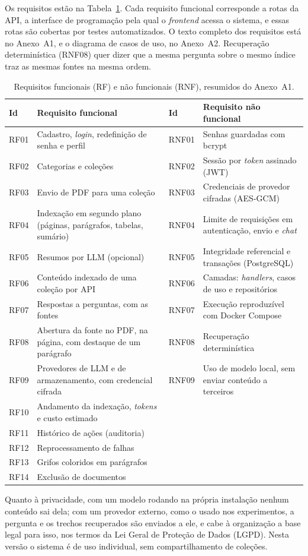 \documentclass[12pt]{article}
\newcommand{\fonte}{\par\vspace{3pt}{\footnotesize Fonte: o autor.}\par}
\begin{document}
Os requisitos estão na Tabela~\ref{tab:requisitos}. Cada requisito funcional corresponde a rotas da API, a interface de programação pela qual o \emph{frontend} acessa o sistema, e essas rotas são cobertas por testes automatizados. O texto completo dos requisitos está no Anexo~A1, e o diagrama de casos de uso, no Anexo~A2. Recuperação determinística (RNF08) quer dizer que a mesma pergunta sobre o mesmo índice traz as mesmas fontes na mesma ordem.

\begin{table}[!htbp]
\centering
\caption{Requisitos funcionais (RF) e não funcionais (RNF), resumidos do Anexo~A1.}
\label{tab:requisitos}
\small
\begin{tabular}{>{\raggedright\arraybackslash}p{0.9cm}>{\raggedright\arraybackslash}p{5.7cm}>{\raggedright\arraybackslash}p{1.1cm}>{\raggedright\arraybackslash}p{5.6cm}}
\toprule
Id & Requisito funcional & Id & Requisito não funcional \\
\midrule
RF01 & Cadastro, \emph{login}, redefinição de senha e perfil & RNF01 & Senhas guardadas com bcrypt \\
RF02 & Categorias e coleções & RNF02 & Sessão por \emph{token} assinado (JWT) \\
RF03 & Envio de PDF para uma coleção & RNF03 & Credenciais de provedor cifradas (AES-GCM) \\
RF04 & Indexação em segundo plano (páginas, parágrafos, tabelas, sumário) & RNF04 & Limite de requisições em autenticação, envio e \emph{chat} \\
RF05 & Resumos por LLM (opcional) & RNF05 & Integridade referencial e transações (PostgreSQL) \\
RF06 & Conteúdo indexado de uma coleção por API & RNF06 & Camadas: \emph{handlers}, casos de uso e repositórios \\
RF07 & Respostas a perguntas, com as fontes & RNF07 & Execução reproduzível com Docker Compose \\
RF08 & Abertura da fonte no PDF, na página, com destaque de um parágrafo & RNF08 & Recuperação determinística \\
RF09 & Provedores de LLM e de armazenamento, com credencial cifrada & RNF09 & Uso de modelo local, sem enviar conteúdo a terceiros \\
RF10 & Andamento da indexação, \emph{tokens} e custo estimado & & \\
RF11 & Histórico de ações (auditoria) & & \\
RF12 & Reprocessamento de falhas & & \\
RF13 & Grifos coloridos em parágrafos & & \\
RF14 & Exclusão de documentos & & \\
\bottomrule
\end{tabular}
\fonte
\end{table}
Quanto à privacidade, com um modelo rodando na própria instalação nenhum conteúdo sai dela; com um provedor externo, como o usado nos experimentos, a pergunta e os trechos recuperados são enviados a ele, e cabe à organização a base legal para isso, nos termos da Lei Geral de Proteção de Dados (LGPD). Nesta versão o sistema é de uso individual, sem compartilhamento de coleções.
\end{document}
